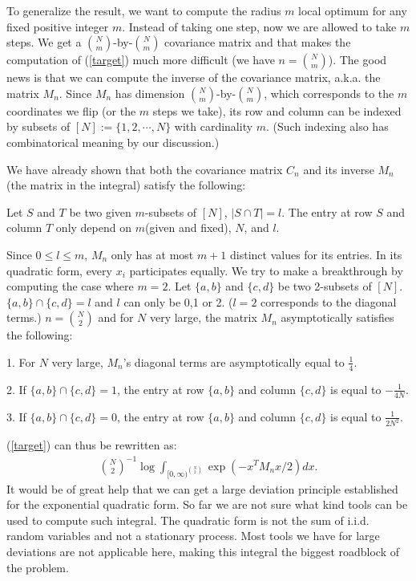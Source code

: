 \documentclass[10pt]{article}
\newenvironment{Proof of lemma}{\noindent{\bf Proof of Lemma}}{\hfill$\Box$\newline}
\newenvironment{Proof of claim}{\noindent{\bf Proof of claim}}{\hfill$\Box$\newline}
\newenvironment{Proof of theorem}{\noindent{\bf Proof of Theorem}}{\hfill\scriptsize{$\Box$}\newline}
\newenvironment{Proof of theorems}{\noindent{\bf Proof of Theorems}}{\hfill$\Box$\newline}
\newenvironment{Proof of proposition}{\noindent{\bf Proof of Proposition}}{\hfill$\Box$\newline}
\newenvironment{Proof of propositions}{\noindent{\bf Proof of Propositions}}{\hfill$\Box$\newline}
\newenvironment{Proof of exercise}{\noindent{\it Proof of Exercise:}}{\hfill$\Box$}
\begin{document}
To generalize the result, we want to compute the radius $m$ local optimum for any fixed positive integer $m$. Instead of taking one step, now we are allowed to take $m$ steps. We get a $\binom{N}{m}$-by-$\binom{N}{m}$ covariance matrix and that makes the computation of (\ref{target}) much more difficult (we have $n = \binom{N}{m}$). The good news is that we can compute the inverse of the covariance matrix, a.k.a. the matrix $M_n$. Since $M_n$ has dimension $\binom{N}{m}$-by-$\binom{N}{m}$, which corresponds to the $m$ coordinates we flip (or the $m$ steps we take), its row and column can be indexed by subsets of $[N]:= \{1,2,\cdots,N\}$ with cardinality $m$. (Such indexing also has combinatorical meaning by our discussion.)

We have already shown that both the covariance matrix $C_n$ and its inverse $M_n$ (the matrix in the integral) satisfy the following:

Let $S$ and $T$ be two given $m$-subsets of $[N]$, $|S \cap T|=l$. The entry at row $S$ and column $T$ only depend on $m$(given and fixed), $N$, and $l$.

Since $0 \leq l \leq m$, $M_n$ only has at most $m+1$ distinct values for its entries. In its quadratic form, every $x_i$ participates equally. We try to make a breakthrough by computing the case where $m=2$. Let $\{a,b\}$ and $\{c,d\}$ be two 2-subsets of $[N]$. $\{a,b\} \cap \{c,d\} = l$ and $l$ can only be 0,1 or 2. ($l=2$ corresponds to the diagonal terms.) $n = \binom{N}{2}$ and for $N$ very large, the matrix $M_n$ asymptotically satisfies the following:

1. For $N$ very large, $M_n$'s diagonal terms are asymptotically equal to $\frac{1}{4}$.

2. If $\{a,b\} \cap \{c,d\} = 1$, the entry at row $\{a,b\}$ and column $\{c,d\}$ is equal to $-\frac{1}{4N}$.

3. If $\{a,b\} \cap \{c,d\} = 0$, the entry at row $\{a,b\}$ and column $\{c,d\}$ is equal to $\frac{1}{2N^2}$.

(\ref{target}) can thus be rewritten as:
\begin{align}
    \binom{N}{2}^{-1}\log \int_{[0,\infty)^{\binom{N}{2}}} \exp \left(-x^T M_n x/2\right)dx.
\end{align}
It would be of great help that we can get a large deviation principle established for the exponential quadratic form. So far we are not sure what kind tools can be used to compute such integral. The quadratic form is not the sum of i.i.d. random variables and not a stationary process. Most tools we have for large deviations are not applicable here, making this integral the biggest roadblock of the problem.
\end{document}
